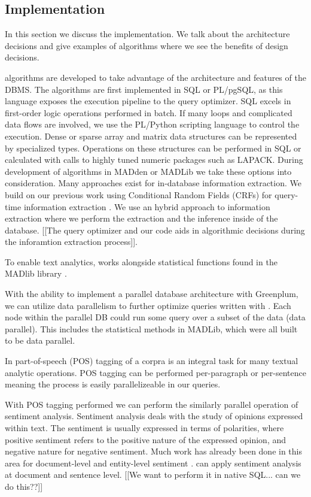 \subsection{{\system} Implementation}

In this section we discuss the \system implementation. We talk about the 
architecture decisions and give examples of algorithms where we see the
benefits of design decisions.


\system algorithms are developed to take advantage of the architecture and 
features of the DBMS.
The algorithms are first implemented in SQL or PL/pgSQL, as this language
exposes the execution pipeline to the query optimizer. 
SQL excels in first-order logic operations performed in batch.
If many loops and complicated data flows are involved, we use the PL/Python 
scripting language to control the execution.
Dense or sparse array and matrix data structures can be represented
by specialized types. Operations on these structures can be performed in
SQL or calculated with calls to highly tuned numeric packages such as LAPACK.
During development of algorithms in MADden or MADLib we take these options 
into consideration.
Many approaches exist for in-database information extraction. 
We build on our previous work using Conditional Random Fields (CRFs) for 
query-time information extraction \cite{wang2011hybrid}. 
We use an hybrid approach to information extraction where we perform the 
extraction and the inference inside of the database. [[The query optimizer and
our code aids in algorithmic decisions during the inforamtion extraction 
process]].

To enable text analytics, {\system} works alongside statistical
functions found in the MADlib library \cite{Cohen:2009:MSN:1687553.1687576}.

With the ability to implement a parallel database architecture with %
Greenplum, we can utilize data parallelism to further optimize queries written
with {\system}. Each node within the parallel DB could run some query
over a subset of the data (data parallel). This includes the statistical methods
in MADLib, which were all built to be data parallel.

In part-of-speech (POS) tagging of a corpra is an integral task for many 
textual analytic operations. POS tagging can be performed per-paragraph or 
per-sentence meaning the process is easily parallelizeable in our queries.

With POS tagging performed we can perform the similarly parallel operation 
of sentiment analysis.
Sentiment analysis deals with the study of opinions expressed within text. 
The sentiment is usually expressed in terms of polarities, where positive
sentiment refers to the positive nature of the expressed opinion, and negative
nature for negative sentiment. Much work has already been done in this
area for document-level and entity-level sentiment \cite{o2010tweets,
zhang2011combining}. 
{\system} can apply sentiment analysis at document and sentence level.
[[We want to perform it in native SQL... can we do this??]]

